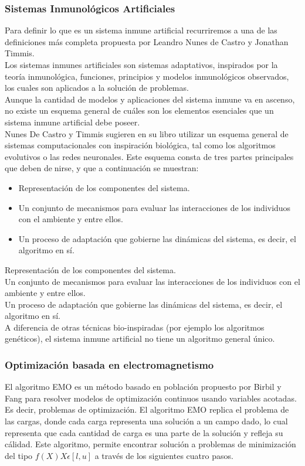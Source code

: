 \documentclass{article}
\begin{document}
\subsubsection{Sistemas Inmunológicos Artificiales}
Para definir lo que es un sistema inmune artificial recurriremos a una de
las definiciones más completa propuesta por Leandro Nunes de Castro y
Jonathan Timmis.\\Los sistemas inmunes artificiales son sistemas adaptativos, inspirados por la teoría inmunológica, funciones, principios y modelos inmunológicos observados, los cuales son aplicados a la
solución de problemas.\\
Aunque la cantidad de modelos y aplicaciones del sistema inmune va en
ascenso, no existe un esquema general de cuáles son los elementos esenciales
que un sistema inmune artificial debe poseer. \\
Nunes De Castro y Timmis sugieren en su libro utilizar un esquema
general de sistemas computacionales con inspiración biológica, tal como los
algoritmos evolutivos o las redes neuronales. Este esquema consta de tres
partes principales que deben denirse, y que a continuación se muestran:

\begin{itemize}
  \item  Representación de los componentes del sistema.
  \item Un conjunto de mecanismos para evaluar las interacciones de los individuos con el ambiente y entre ellos.
  \item Un proceso de adaptación que gobierne las dinámicas del sistema, es
decir, el algoritmo en sí.
\end{itemize}

 Representación de los componentes del sistema.\\
 Un conjunto de mecanismos para evaluar las interacciones de los individuos con el ambiente y entre ellos.\\
 Un proceso de adaptación que gobierne las dinámicas del sistema, es
decir, el algoritmo en sí.\\

A diferencia de otras técnicas bio-inspiradas (por ejemplo los algoritmos
genéticos), el sistema inmune artificial no tiene un algoritmo general único.\cite{Cuevas(2016)}

\subsubsection{Optimizaci\'on basada en electromagnetismo}
El algoritmo EMO es un método basado en población propuesto por Birbil y Fang  para resolver modelos de optimización continuos usando variables acotadas. Es decir,  problemas de optimización.
El algoritmo EMO replica el problema de las cargas, donde cada carga representa una solución a un campo dado, lo cual representa que cada cantidad de carga es una parte de la solución y refleja su cálidad. Este algoritmo, permite encontrar solución a problemas de minimización del tipo $f(X) X \epsilon [l,u]$ a través de los siguientes cuatro pasos.
\end{document}
